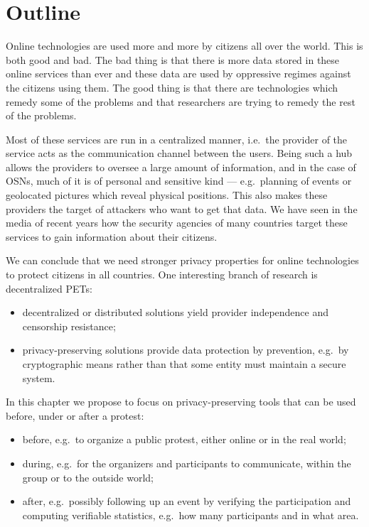 \documentclass[a4paper]{llncs}
\begin{document}
\section{Outline}
\label{Outline}

Online technologies are used more and more by citizens all over the world.
This is both good and bad.
The bad thing is that there is more data stored in these online services than 
ever and these data are used by oppressive regimes against the citizens using 
them.
The good thing is that there are technologies which remedy some of the problems 
and that researchers are trying to remedy the rest of the problems.

Most of these services are run in a centralized manner, i.e.\ the provider of 
the service acts as the communication channel between the users.
Being such a hub allows the providers to oversee a large amount of information, 
and in the case of \acp{OSN}, much of it is of personal and sensitive kind ---  
e.g.\ planning of events or geolocated pictures which reveal physical 
positions.
This also makes these providers the target of attackers who want to get that 
data.
We have seen in the media of recent years how the security agencies of many 
countries target these services to gain information about their citizens.

We can conclude that we need stronger privacy properties for online 
technologies to protect citizens in all countries.
One interesting branch of research is decentralized \acp{PET}:
\begin{itemize}
  \item decentralized or distributed solutions yield provider independence and 
    censorship resistance;
  \item privacy-preserving solutions provide data protection by prevention, 
    e.g.\ by cryptographic means rather than that some entity must maintain 
    a secure system.
\end{itemize}
In this chapter we propose to focus on privacy-preserving tools that can be 
used before, under or after a protest:
\begin{itemize}
  \item before, e.g.\ to organize a public protest, either online or in the 
    real world;
  \item during, e.g.\ for the organizers and participants to communicate, 
    within the group or to the outside world;
  \item after, e.g.\ possibly following up an event by verifying the 
    participation and computing verifiable statistics, e.g.\ how many 
    participants and in what area.
\end{itemize}
\end{document}
